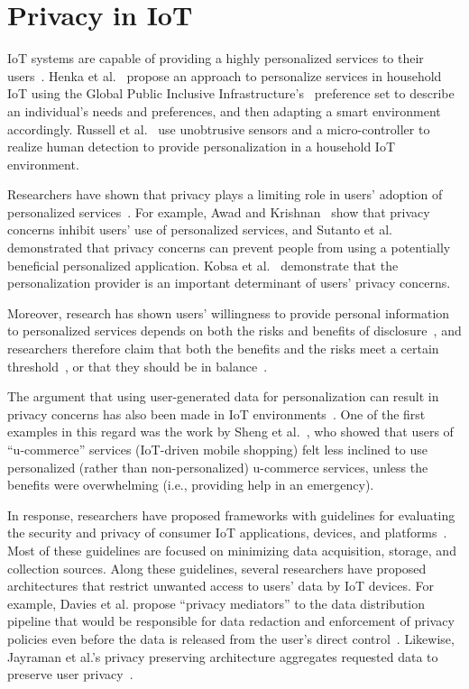 \section{Privacy in IoT}
IoT systems are capable of providing a highly personalized services to their users~\cite{vallee2016personalization, etzion2014personalization, hemant2015internet}. Henka et al.~\cite{henka2016personalizing} propose an approach to personalize services in household IoT using the Global Public Inclusive Infrastructure's~\cite{vanderheiden2011creating} preference set to describe an individual's needs and preferences, and then adapting a smart environment accordingly. Russell et al.~\cite{russell2015personalization} use unobtrusive sensors and a micro-controller to realize human detection to provide personalization in a household IoT environment.

Researchers have shown that privacy plays a limiting role in users' adoption of personalized services~\cite{teltzrow_2004}. For example, Awad and Krishnan~\cite{awad_2006} show that privacy concerns inhibit users' use of personalized services, and Sutanto et al.~\cite{sutanto_2013} demonstrated that privacy concerns can prevent people from using a potentially beneficial personalized application. Kobsa et al.~\cite{kobsa_2016} demonstrate that the personalization provider is an important determinant of users' privacy concerns.

Moreover, research has shown  users' willingness to provide personal information to personalized services depends on both the risks and benefits of disclosure~\cite{phelps_2000,ho_2006,hui_2006}, and researchers therefore claim that both the benefits and the risks meet a certain threshold~\cite{treiblmaier_2007}, or that they should be in balance~\cite{chellappa_2005}.

The argument that using user-generated data for personalization can result in privacy concerns has also been made in IoT environments~\cite{worthy_trust_2016, gao2014unified, al2016modeling}. One of the first examples in this regard was the work by Sheng et al.~\cite{sheng_experimental_2008}, who showed that users of ``u-commerce'' services (IoT-driven mobile shopping) felt less inclined to use personalized (rather than non-personalized) u-commerce services, unless the benefits were overwhelming (i.e., providing help in an emergency).

In response, researchers have proposed frameworks with guidelines for evaluating the security and privacy of consumer IoT applications, devices, and platforms~\cite{perera_privacy-by-design_2016, loi_systematically_2017}. Most of these guidelines are focused on minimizing data acquisition, storage, and collection sources. Along these guidelines, several researchers have proposed architectures that restrict unwanted access to users' data by IoT devices. For example, Davies et al. propose ``privacy mediators'' to the data distribution pipeline that would be responsible for data redaction and enforcement of privacy policies even before the data is released from the user's direct control~\cite{davies_privacy_2016}. Likewise, Jayraman et al.'s privacy preserving architecture aggregates requested data to preserve user privacy~\cite{jayaraman_privacy_2017}.

